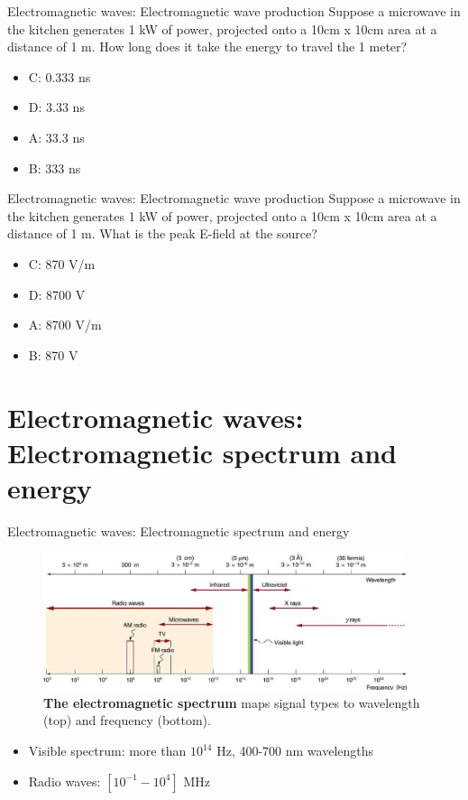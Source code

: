 \documentclass{beamer}
\begin{document}
\begin{frame}{Electromagnetic waves: Electromagnetic wave production}
Suppose a microwave in the kitchen generates 1 kW of power, projected onto a 10cm x 10cm area at a distance of 1 m.  How long does it take the energy to travel the 1 meter?
\begin{itemize}
\item C: 0.333 ns
\item D: 3.33 ns
\item A: 33.3 ns
\item B: 333 ns
\end{itemize}
\end{frame}

\begin{frame}{Electromagnetic waves: Electromagnetic wave production}
Suppose a microwave in the kitchen generates 1 kW of power, projected onto a 10cm x 10cm area at a distance of 1 m.  What is the peak E-field at the source?
\begin{itemize}
\item C: 870 V/m
\item D: 8700 V
\item A: 8700 V/m
\item B: 870 V
\end{itemize}
\end{frame}

\section{Electromagnetic waves: Electromagnetic spectrum and energy}

\begin{frame}{Electromagnetic waves: Electromagnetic spectrum and energy}
\small
\begin{figure}
\centering
\includegraphics[width=0.95\textwidth]{figures/spectrum.png}
\caption{\label{fig:spectrum} \textbf{\alert{The electromagnetic spectrum}} maps signal types to wavelength (top) and frequency (bottom).}
\end{figure}
\begin{itemize}
\item Visible spectrum: more than $10^{14}$ Hz, 400-700 nm wavelengths
\item Radio waves: $[10^{-1} - 10^4]$ MHz
\end{itemize}
\end{frame}
\end{document}

